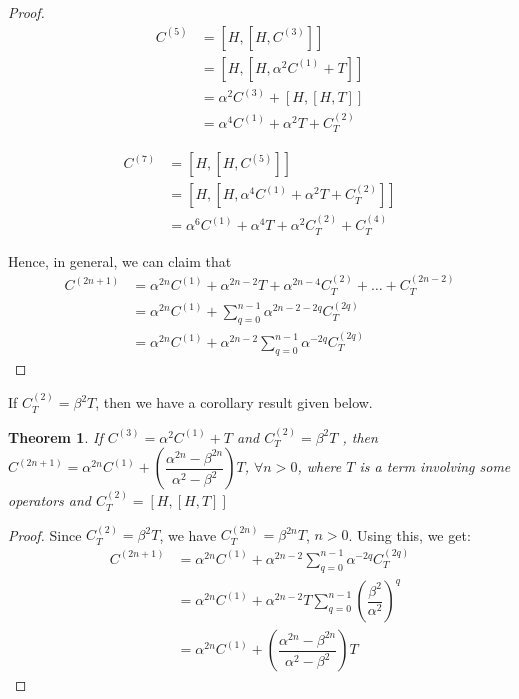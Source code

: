 \documentclass[11pt,a4paper]{article}
\newtheorem{thm}{Theorem}
\begin{document}
\begin{proof}

\begin{align}
C^{(5)} &= [H,[H,C^{(3)}]]\\
&=[H,[H, \alpha^2  C^{(1)} + T ]] \\
&=\alpha^2 C^{(3)} + [H,[H, T ]] \\
&=\alpha^4 C^{(1)} + \alpha^2 T + C^{(2)}_T
\end{align}

\begin{align}
C^{(7)} &= [H,[H,C^{(5)}]]\\
&=[H,[H, \alpha^4 C^{(1)} + \alpha^2 T + C^{(2)}_T ]] \\
&=\alpha^6 C^{(1)} + \alpha^4 T + \alpha^2  C^{(2)}_T +   C^{(4)}_T
\end{align}

Hence, in general, we can claim that 
\begin{align*}
C^{(2n+1)} &=\alpha^{2n} C^{(1)} + \alpha^{2n-2} T +\alpha^{2n-4}  C^{(2)}_T + \ldots +    C^{(2n-2)}_T \\
&=\alpha^{2n} C^{(1)} + \sum_{q=0}^{n-1} \alpha^{2n-2-2q}C^{(2q)}_T \\
&=\alpha^{2n} C^{(1)} + \alpha^{2n-2} \sum_{q=0}^{n-1} \alpha^{-2q}C^{(2q)}_T 
\end{align*}
\end{proof}

If $C^{(2)}_T= \beta^2 T $, then we have a corollary result given below.
\begin{thm}
If $C^{(3)}=  \alpha^2  C^{(1)} + T$ and $C^{(2)}_T= \beta^2 T $ , then $C^{(2n+1)}=\alpha^{2n} C^{(1)} +  \left(\dfrac{\alpha^{2n}- \beta ^{2n} }{\alpha^2- \beta ^2}\right)  T$, $\forall n>0$,  where $T$ is a term involving some operators and $ C^{(2)}_T=[H, [H, T]]$
\end{thm}

\begin{proof}
Since $C^{(2)}_T= \beta^2 T $, we have  $C^{(2n)}_T= \beta^{2n} T $, $n>0$. Using this, we get:
\begin{align*}
C^{(2n+1)} &=\alpha^{2n} C^{(1)} + \alpha^{2n-2} \sum_{q=0}^{n-1} \alpha^{-2q}C^{(2q)}_T \\
&=\alpha^{2n} C^{(1)} + \alpha^{2n-2} T \sum_{q=0}^{n-1}  \left(\dfrac{\beta^2}{\alpha^2}\right)^{q} \\
&=\alpha^{2n} C^{(1)} +  \left(\dfrac{\alpha^{2n}- \beta ^{2n} }{\alpha^2- \beta ^2}\right)  T
\end{align*}
\end{proof}
\end{document}
